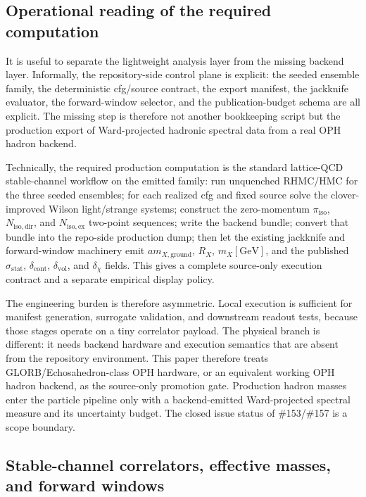 \documentclass[11pt]{article}
\begin{document}
\subsection{Operational reading of the required computation}

It is useful to separate the lightweight analysis layer from the missing backend layer.
Informally, the repository-side control plane is explicit: the seeded ensemble family, the
deterministic cfg/source contract, the export manifest, the jackknife evaluator, the forward-window
selector, and the publication-budget schema are all explicit. The missing step is therefore not
another bookkeeping script but the production export of Ward-projected hadronic spectral data from
a real OPH hadron backend.

Technically, the required production computation is the standard lattice-QCD stable-channel
workflow on the emitted family: run unquenched RHMC/HMC for the three seeded ensembles; for each
realized cfg and fixed source solve the clover-improved Wilson light/strange systems; construct the
zero-momentum \(\pi_{\mathrm{iso}}\), \(N_{\mathrm{iso,dir}}\), and \(N_{\mathrm{iso,ex}}\)
two-point sequences; write the backend bundle; convert that bundle into the repo-side production
dump; then let the existing jackknife and forward-window machinery emit
\(a m_{X,\mathrm{ground}}\), \(R_X\), \(m_X[\mathrm{GeV}]\), and the published
\(\sigma_{\mathrm{stat}}\), \(\delta_{\mathrm{cont}}\), \(\delta_{\mathrm{vol}}\), and
\(\delta_{\chi}\) fields. This gives a complete source-only execution contract and a separate
empirical display policy.

The engineering burden is therefore asymmetric. Local execution is sufficient for manifest
generation, surrogate validation, and downstream readout tests, because those stages operate on a
tiny correlator payload. The physical branch is different: it needs backend hardware and execution
semantics that are absent from the repository environment. This paper therefore treats
GLORB/Echosahedron-class OPH hardware, or an equivalent working OPH hadron backend, as the
source-only promotion gate. Production hadron masses enter the particle pipeline only with a
backend-emitted Ward-projected spectral measure and its uncertainty budget. The closed issue status
of \#153/\#157 is a scope boundary.

\subsection{Stable-channel correlators, effective masses, and forward windows}
\end{document}
